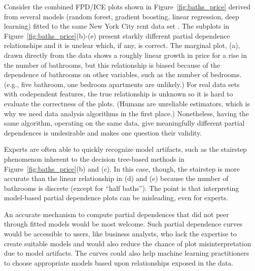 \documentclass{article}
\newcommand{\figref}[1]{Figure~\ref{#1}}
\begin{document}
Consider the combined FPD/ICE plots shown in \figref{fig:baths_price} derived from several models (random forest, gradient boosting, linear regression, deep learning) fitted to the same New York City rent data set \citet{rent}.  The subplots in \figref{fig:baths_price}(b)-(e)  present starkly different partial dependence relationships and it is unclear which, if any, is correct.  The marginal plot, (a), drawn directly from the data shows a roughly linear growth in price for a rise in the number of bathrooms, but this relationship is biased because of the dependence of bathrooms on other variables, such as the number of bedrooms. (e.g., five bathroom, one bedroom apartments are unlikely.)  For real data sets with codependent features, the true relationship is unknown so it is hard to evaluate the correctness of the plots. (Humans are unreliable estimators, which is why we need data analysis algorithms in the first place.) Nonetheless, having the same algorithm, operating on the same data, give meaningfully different partial dependences is undesirable and makes one question their validity.

Experts are often able to quickly recognize model artifacts, such as the stairstep phenomenon inherent to the decision tree-based methods in \figref{fig:baths_price}(b) and (c).  In this case, though, the stairstep is more accurate than the linear relationship in (d) and (e) because the number of bathrooms is discrete (except for ``half baths'').  The point is that interpreting model-based partial dependence plots can be misleading, even for experts. 

An accurate mechanism to compute partial dependences that did not peer through fitted models would be most welcome.  Such partial dependence curves would be accessible to users, like business analysts, who lack the expertise to create suitable models and would also reduce the chance of plot misinterpretation due to model artifacts. The curves could also help machine learning practitioners to choose appropriate models based upon relationships exposed in the data.
\end{document}
